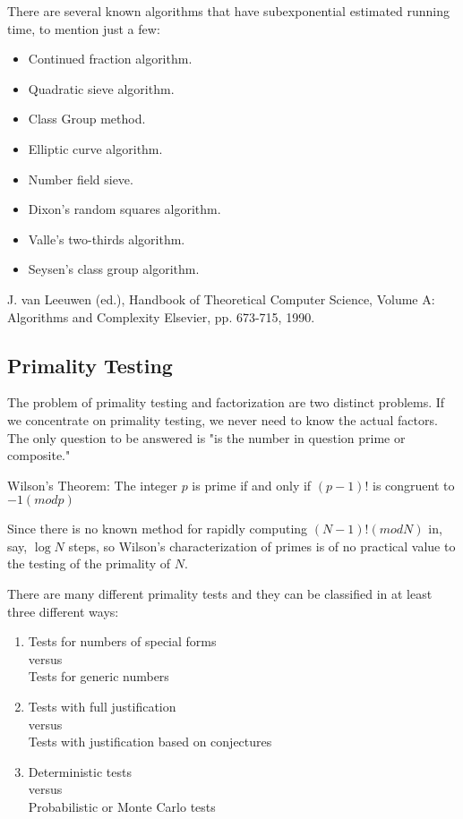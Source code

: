 There are several known algorithms that have subexponential estimated 
    running time, to mention just a few:

\begin{itemize}
\item Continued fraction algorithm.
        \item Quadratic sieve algorithm.
        \item Class Group method.
        \item Elliptic curve algorithm.
        \item Number field sieve.
        \item Dixon's random squares algorithm.
        \item Valle's two-thirds algorithm.
        \item Seysen's class group algorithm.
\end{itemize}


\Ref

    {J. van Leeuwen (ed.), Handbook of Theoretical Computer 
    Science, Volume A: Algorithms and Complexity}{ Elsevier, pp. 
    673-715, 1990.}

\subsection{Primality Testing}

The problem of primality testing and factorization are two distinct
problems. If we concentrate on primality testing, we never need to know
the actual factors. The only question to be answered is "is the number
in question prime or composite."


Wilson's Theorem: The integer $p$ is prime if and only if
$(p-1)!$ is congruent to $-1 (mod p)$

Since there is no known method for rapidly computing $(N-1)! (mod N)$ in,
say, $\log N$ steps, so Wilson's characterization of primes is of no
practical value to the testing of the primality of $N$.


There are many different primality tests and they can be classified in
at least three different ways:

\begin{enumerate}
\item Tests for numbers of special forms \\
           versus \\
   Tests for generic numbers
\item Tests with full justification \\
           versus\\
   Tests with justification based on conjectures
\item Deterministic tests\\
           versus \\
   Probabilistic or Monte Carlo tests
\end{enumerate}


